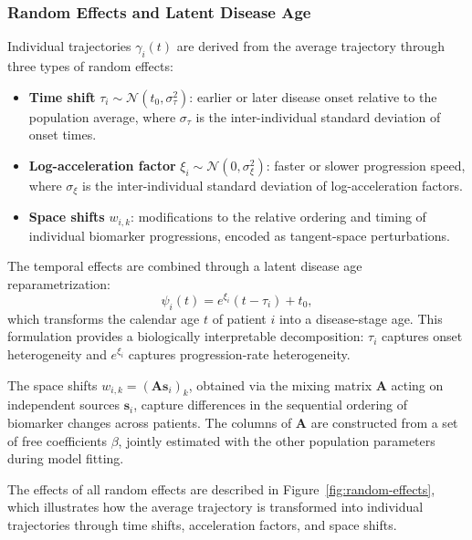 \documentclass{rapportCS}
\begin{document}
\subsubsection{Random Effects and Latent Disease Age}

 Individual trajectories $\gamma_i(t)$ are derived from the average trajectory through three types of random effects:

\begin{itemize}
  \item \textbf{Time shift} $\tau_i \sim \mathcal{N}(t_0, \sigma_\tau^2)$: earlier or later disease onset relative to the population average, where $\sigma_\tau$ is the inter-individual standard deviation of onset times.
  \item \textbf{Log-acceleration factor} $\xi_i \sim \mathcal{N}(0, \sigma_\xi^2)$: faster or slower progression speed, where $\sigma_\xi$ is the inter-individual standard deviation of log-acceleration factors.
  \item \textbf{Space shifts} $w_{i,k}$: modifications to the relative ordering and timing of individual biomarker progressions, encoded as tangent-space perturbations.
\end{itemize}

The temporal effects are combined through a latent disease age reparametrization:
\begin{equation}
  \psi_i(t) = e^{\xi_i}(t - \tau_i) + t_0,
\label{eq:latent-age}
\end{equation} 
which transforms the calendar age $t$ of patient $i$ into a disease-stage age. This formulation provides a biologically interpretable decomposition: $\tau_i$ captures onset heterogeneity and $e^{\xi_i}$ captures progression-rate heterogeneity.

The space shifts $w_{i,k} = (\mathbf{A}\mathbf{s}_i)_k$, obtained via the mixing matrix $\mathbf{A}$ acting on independent sources $\mathbf{s}_i$, capture differences in the sequential ordering of biomarker changes across patients. The columns of $\mathbf{A}$ are constructed from a set of free coefficients $\beta$, jointly estimated with the other population parameters during model fitting.

The effects of all random effects are described in Figure~\ref{fig:random-effects}, which illustrates how the average trajectory is transformed into individual trajectories through time shifts, acceleration factors, and space shifts.
\end{document}
